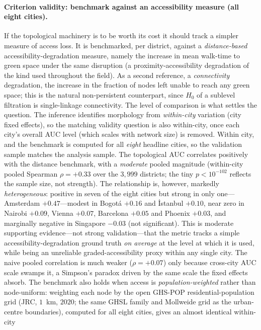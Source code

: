 \documentclass[sn-mathphys-num,pdflatex]{sn-jnl}
\begin{document}
\paragraph{Criterion validity: benchmark against an accessibility measure (all eight cities).} If the
topological machinery is to be worth its cost it should track a simpler measure of
access loss. It is benchmarked, per district, against a \emph{distance-based}
accessibility-degradation measure, namely the increase in mean walk-time to green
space under the same disruption (a proximity-accessibility degradation of the kind
used throughout the field). As a second reference, a \emph{connectivity}
degradation, the increase in the fraction of nodes left unable to reach any green
space; this is the natural non-persistent counterpart, since $H_0$ of a sublevel
filtration is single-linkage connectivity. The level of comparison is what settles
the question. The inference identifies morphology from \emph{within-city} variation
(city fixed effects), so the matching validity question is also within-city, once
each city's overall AUC level (which scales with network size) is removed. Within
city, and the benchmark is computed for all \emph{eight} headline cities, so the
validation sample matches the analysis sample. The topological AUC correlates
positively with the distance benchmark, with a \emph{moderate} pooled magnitude
(within-city pooled Spearman $\rho=+0.33$ over the $3{,}999$ districts; the tiny
$p<10^{-102}$ reflects the sample size, not strength). The relationship is, however,
markedly \emph{heterogeneous}: positive in seven of the eight cities but strong in
only one---Amsterdam $+0.47$---modest in Bogotá $+0.16$ and İstanbul $+0.10$, near
zero in Nairobi $+0.09$, Vienna $+0.07$, Barcelona $+0.05$ and Phoenix $+0.03$, and
marginally negative in Singapore $-0.03$ (not significant). This is moderate
supporting evidence---not strong validation---that the metric tracks a simple
accessibility-degradation ground truth \emph{on average} at the level at which it is
used, while being an unreliable graded-accessibility proxy within any single city. The naive pooled correlation is much
weaker ($\rho=+0.07$) only because cross-city AUC scale swamps it, a Simpson's
paradox driven by the same scale the fixed effects absorb. The benchmark also holds
when access is \emph{population-weighted} rather than node-uniform: weighting each
node by the open GHS-POP residential-population grid \citep{ghsl2023pop} (JRC,
$1$~km, $2020$; the same GHSL family and Mollweide grid as the urban-centre
boundaries), computed for all eight cities, gives an almost identical within-city
\end{document}
